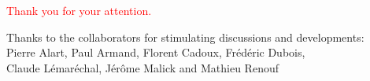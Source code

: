 \documentclass[8pt,red]{beamer}
\begin{document}


\frame
{

  

  \vspace{1cm}
  \centerline{\textcolor{red}{ Thank you for your attention.}}

  \begin{center}
    Thanks to the collaborators for stimulating discussions and developments:\\[2mm]
    
    Pierre Alart, Paul Armand, Florent Cadoux, Fr\'ed\'eric Dubois,\\
    Claude L\'emar\'echal, J\'er\^ome Malick and Mathieu Renouf 
  \end{center}
}

 
\def\newblock{}
{\scriptsize
\printbibliography
}
\end{document}

